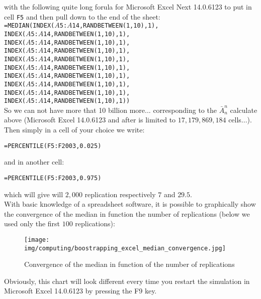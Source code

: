 	\begin{tcolorbox}[colframe=black,colback=white,sharp corners]
	with the following quite long forula for Microsoft Excel Next 14.0.6123 to put in cell \texttt{F5} and then pull down to the end of the sheet:\\
	
	\texttt{=MEDIAN(INDEX($A$5:$A$14,RANDBETWEEN(1,10),1),\\
INDEX($A$5:$A$14,RANDBETWEEN(1,10),1),\\
INDEX($A$5:$A$14,RANDBETWEEN(1,10),1),\\
INDEX($A$5:$A$14,RANDBETWEEN(1,10),1),\\
INDEX($A$5:$A$14,RANDBETWEEN(1,10),1),\\
INDEX($A$5:$A$14,RANDBETWEEN(1,10),1),\\
INDEX($A$5:$A$14,RANDBETWEEN(1,10),1),\\
INDEX($A$5:$A$14,RANDBETWEEN(1,10),1),\\
INDEX($A$5:$A$14,RANDBETWEEN(1,10),1),\\
INDEX($A$5:$A$14,RANDBETWEEN(1,10),1))
	}\\
	
	So we can not have more that 10 billion more... corresponding to the $\bar{A}_n^n$ calculate above (Microsoft Excel 14.0.6123 and after is limited  to $17,179,869,184$ cells...).\\
	
	Then simply in a cell of your choice we write:
	\begin{center}
	\texttt{=PERCENTILE(F5:F2003,0.025)}
	\end{center}
	and in another cell:
	\begin{center}
	\texttt{=PERCENTILE(F5:F2003,0.975)}
	\end{center}
	
	which will give will $2,000$ replication respectively $7$ and $29.5$.\\

	With basic knowledge of a spreadsheet software, it is possible to graphically show the convergence of the median in function the number of replications (below we used only the first $100$ replications):
	\begin{figure}[H]
		\centering
		\texttt{[image: img/computing/boostrapping\_excel\_median\_convergence.jpg]}
		\caption[]{Convergence of the median in function of the number of replications}
	\end{figure}
	Obviously, this chart will look different every time you restart the simulation in Microsoft Excel 14.0.6123 by pressing the F9 key.
	\end{tcolorbox}
	
